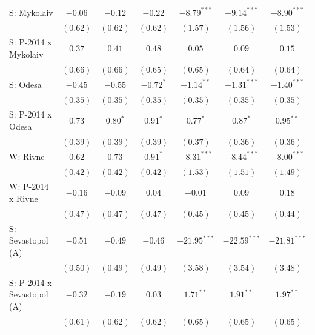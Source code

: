 \begin{table}
\begin{center}
\begin{small}
\begin{tabular}{l c c c c c c}
S: Mykolaiv                 & $-0.06$       & $-0.12$     & $-0.22$        & $-8.79^{***}$  & $-9.14^{***}$  & $-8.90^{***}$  \\
                            & $(0.62)$      & $(0.62)$    & $(0.62)$       & $(1.57)$       & $(1.56)$       & $(1.53)$       \\
S: P-2014 x Mykolaiv        & $0.37$        & $0.41$      & $0.48$         & $0.05$         & $0.09$         & $0.15$         \\
                            & $(0.66)$      & $(0.66)$    & $(0.65)$       & $(0.65)$       & $(0.64)$       & $(0.64)$       \\
S: Odesa                    & $-0.45$       & $-0.55$     & $-0.72^{*}$    & $-1.14^{**}$   & $-1.31^{***}$  & $-1.40^{***}$  \\
                            & $(0.35)$      & $(0.35)$    & $(0.35)$       & $(0.35)$       & $(0.35)$       & $(0.35)$       \\
S: P-2014 x Odesa           & $0.73$        & $0.80^{*}$  & $0.91^{*}$     & $0.77^{*}$     & $0.87^{*}$     & $0.95^{**}$    \\
                            & $(0.39)$      & $(0.39)$    & $(0.39)$       & $(0.37)$       & $(0.36)$       & $(0.36)$       \\
W: Rivne                    & $0.62$        & $0.73$      & $0.91^{*}$     & $-8.31^{***}$  & $-8.44^{***}$  & $-8.00^{***}$  \\
                            & $(0.42)$      & $(0.42)$    & $(0.42)$       & $(1.53)$       & $(1.51)$       & $(1.49)$       \\
W: P-2014 x Rivne           & $-0.16$       & $-0.09$     & $0.04$         & $-0.01$        & $0.09$         & $0.18$         \\
                            & $(0.47)$      & $(0.47)$    & $(0.47)$       & $(0.45)$       & $(0.45)$       & $(0.44)$       \\
S: Sevastopol (A)           & $-0.51$       & $-0.49$     & $-0.46$        & $-21.95^{***}$ & $-22.59^{***}$ & $-21.81^{***}$ \\
                            & $(0.50)$      & $(0.49)$    & $(0.49)$       & $(3.58)$       & $(3.54)$       & $(3.48)$       \\
S: P-2014 x Sevastopol (A)  & $-0.32$       & $-0.19$     & $0.03$         & $1.71^{**}$    & $1.91^{**}$    & $1.97^{**}$    \\
                            & $(0.61)$      & $(0.62)$    & $(0.62)$       & $(0.65)$       & $(0.65)$       & $(0.65)$       \\

\end{tabular}
\end{small}
\end{center}
\end{table}
